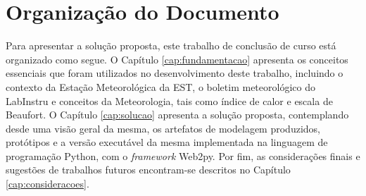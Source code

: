 \section{Organização do Documento}

Para apresentar a solução proposta, este trabalho de conclusão de curso está organizado como segue. O Capítulo \ref{cap:fundamentacao} apresenta os conceitos essenciais que foram utilizados no desenvolvimento deste trabalho, incluindo o contexto da Estação Meteorológica da EST, o boletim meteorológico do LabInstru e conceitos da Meteorologia, tais como índice de calor e escala de Beaufort. O Capítulo \ref{cap:solucao} apresenta a solução proposta, contemplando desde uma visão geral da mesma, os artefatos de modelagem produzidos, protótipos e a versão executável da mesma implementada na linguagem de programação Python, com o \emph{framework} Web2py. Por fim, as considerações finais e sugestões de trabalhos futuros encontram-se descritos no Capítulo \ref{cap:consideracoes}.
